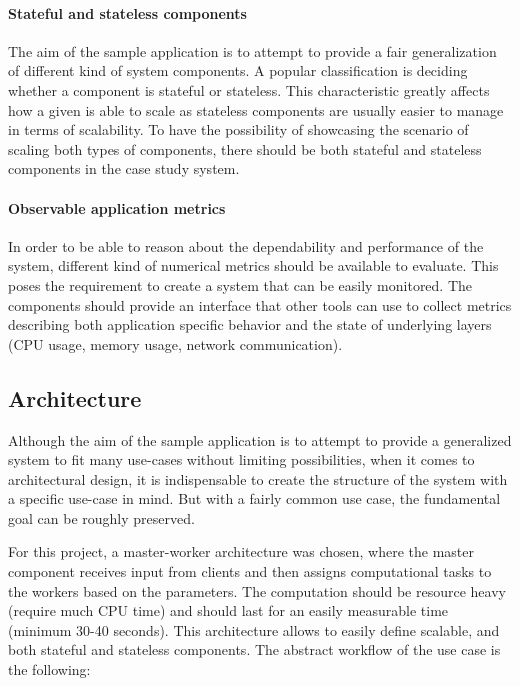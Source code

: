 \paragraph{Stateful and stateless components}The aim of the sample application is to attempt to provide a fair generalization of different kind of system components. A popular classification is deciding whether a component is stateful or stateless. This characteristic greatly affects how a given is able to scale as stateless components are usually easier to manage in terms of scalability. To have the possibility of showcasing the scenario of scaling both types of components, there should be both stateful and stateless components in the case study system.

\paragraph{Observable application metrics}In order to be able to reason about the dependability and performance of the system, different kind of numerical metrics should be available to evaluate. This poses the requirement to create a system that can be easily monitored. The 
components should provide an interface that other tools can use to collect metrics describing both application specific behavior and the state of underlying layers (\eg CPU usage, memory usage, network communication).


\subsection{Architecture}

Although the aim of the sample application is to attempt to provide a generalized system to fit many use-cases without limiting possibilities, when it comes to architectural design, it is indispensable to create the structure of the system with a specific use-case in mind. But with a fairly common use case, the fundamental goal can be roughly preserved.

For this project, a master-worker architecture was chosen, where the master component receives input from clients and then assigns computational tasks to the workers based on the parameters. The computation should be resource heavy (\eg require much CPU time) and should last for an easily measurable time (minimum 30-40 seconds). This architecture allows to easily define scalable, and both stateful and stateless components. The abstract workflow of the use case is the following:

